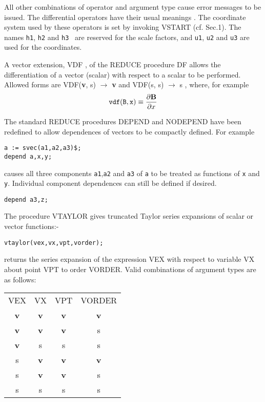 All other combinations of operator and argument type cause error
messages to be issued.  The differential operators have their usual
meanings \cite{r3}.  The coordinate system used by these operators is
set by invoking  VSTART (cf. Sec.1).  The names {\tt h1}, 
{\tt h2}  and {\tt h3 } are
reserved for the scale factors, and {\tt u1}, {\tt u2} and {\tt u3} are 
used for the coordinates.

A vector extension, VDF , of the REDUCE procedure DF allows the 
differentiation of a vector (scalar) with respect to a scalar to be
performed.  Allowed forms are
VDF({\bf v}, s)  $\rightarrow$  {\bf v}   and
VDF(s, s)  $\rightarrow$   s , 
where, for example\\
\begin{eqnarray*}
{\tt vdf( B,x)} \equiv \frac{\partial {\bf B}}{\partial x}
\end{eqnarray*}

The standard REDUCE procedures DEPEND and NODEPEND have been redefined
to allow dependences of vectors to be compactly
defined.  For example
\begin{verbatim}
a := svec(a1,a2,a3)$;
depend a,x,y;
\end{verbatim}
causes all three components {\tt a1},{\tt a2} and {\tt a3} of {\tt a} 
to be treated as functions of {\tt x} and {\tt y}.
Individual component dependences can still be defined if desired.
\begin{verbatim}
depend a3,z;
\end{verbatim}

The procedure VTAYLOR gives truncated Taylor series expansions of scalar
or vector functions:-
\begin{verbatim}
vtaylor(vex,vx,vpt,vorder);
\end{verbatim}
returns the series expansion of the expression 
VEX  with respect to variable VX
about point VPT  to order VORDER.  Valid
combinations of argument types are as follows:\\

\begin{tabular}{cccc}
VEX & VX & VPT &  VORDER \\[2ex]
{\bf v} & {\bf v} &  {\bf v} &  {\bf v}\\
{\bf v} &  {\bf v} & {\bf v} & s\\
{\bf v} & s & s & s \\
s & {\bf v} &  {\bf v} & {\bf v}   \\
s & {\bf v} & {\bf v} & s\\
s & s & s & s\\
\end{tabular}\\

